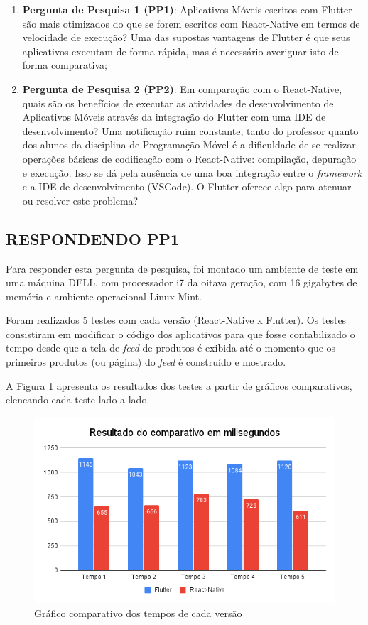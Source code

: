 \documentclass[12pt]{article}
\begin{document}
\begin{enumerate}
    \item \textbf{Pergunta de Pesquisa 1 (PP1)}: Aplicativos Móveis escritos com Flutter são mais otimizados do que se forem escritos com React-Native em termos de velocidade de execução? Uma das supostas vantagens de Flutter é que seus aplicativos executam de forma rápida, mas é necessário averiguar isto de forma comparativa; 
    \item \textbf{Pergunta de Pesquisa 2 (PP2)}: Em comparação com o React-Native, quais são os benefícios de executar as atividades de desenvolvimento de Aplicativos Móveis através da integração do Flutter com uma IDE de desenvolvimento? Uma notificação ruim constante, tanto do professor quanto dos alunos da disciplina de Programação Móvel é a dificuldade de se realizar operações básicas de codificação com o React-Native: compilação, depuração e execução. Isso se dá pela ausência de uma boa integração entre o \textit{framework} e a IDE de desenvolvimento (VSCode). O Flutter oferece algo para atenuar ou resolver este problema?
\end{enumerate}

\subsection{RESPONDENDO PP1} \label{sec:pp1}

Para responder esta pergunta de pesquisa, foi montado um ambiente de teste em uma máquina DELL, com processador i7 da oitava geração, com 16 gigabytes de memória e ambiente operacional Linux Mint.

Foram realizados 5 testes com cada versão (React-Native x Flutter). Os testes consistiram em modificar o código dos aplicativos para que fosse contabilizado o tempo desde que a tela de \textit{feed} de produtos é exibida até o momento que os primeiros produtos (ou página) do \textit{feed} é construído e mostrado.

A Figura \ref{fig:graficos} apresenta os resultados dos testes a partir de gráficos comparativos, elencando cada teste lado a lado. 

\begin{figure}[ht!]
\centering
\includegraphics[width=.8\textwidth]{imagens/grafic.png}
\caption{Gráfico comparativo dos tempos de cada versão}
\label{fig:graficos}
\end{figure}
\end{document}
